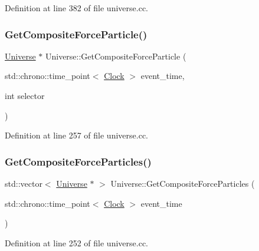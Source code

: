 Definition at line 382 of file universe.\+cc.

\mbox{\label{class_universe_a3e2acc1d75765a6e8e852fca919c5b96}} 
\subsubsection{\texorpdfstring{Get\+Composite\+Force\+Particle()}{GetCompositeForceParticle()}}
{\footnotesize\ttfamily \mbox{\hyperlink{class_universe}{Universe}} $\ast$ Universe\+::\+Get\+Composite\+Force\+Particle (\begin{DoxyParamCaption}\item[{std\+::chrono\+::time\+\_\+point$<$ \mbox{\hyperlink{universe_8h_a0ef8d951d1ca5ab3cfaf7ab4c7a6fd80}{Clock}} $>$}]{event\+\_\+time,  }\item[{int}]{selector }\end{DoxyParamCaption})}



Definition at line 257 of file universe.\+cc.

\mbox{\label{class_universe_aed37d7224b4e31bdfb0632e39bf19694}} 
\subsubsection{\texorpdfstring{Get\+Composite\+Force\+Particles()}{GetCompositeForceParticles()}}
{\footnotesize\ttfamily std\+::vector$<$ \mbox{\hyperlink{class_universe}{Universe}} $\ast$ $>$ Universe\+::\+Get\+Composite\+Force\+Particles (\begin{DoxyParamCaption}\item[{std\+::chrono\+::time\+\_\+point$<$ \mbox{\hyperlink{universe_8h_a0ef8d951d1ca5ab3cfaf7ab4c7a6fd80}{Clock}} $>$}]{event\+\_\+time }\end{DoxyParamCaption})}



Definition at line 252 of file universe.\+cc.

\mbox{\label{class_universe_ab79a380dee684c6dc304b571f4d28645}} 
